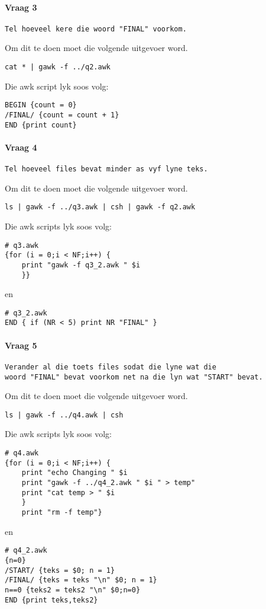 \documentclass[a4paper,11pt,titlepage]{article}
\begin{document}
\paragraph{Vraag 3}
\begin{verbatim}
Tel hoeveel kere die woord "FINAL" voorkom.
\end{verbatim}
Om dit te doen moet die volgende uitgevoer word.
\begin{verbatim}
cat * | gawk -f ../q2.awk
\end{verbatim}

Die awk script lyk soos volg:
\begin{verbatim}
BEGIN {count = 0}
/FINAL/ {count = count + 1}
END {print count}
\end{verbatim}

\paragraph{Vraag 4}
\begin{verbatim}
Tel hoeveel files bevat minder as vyf lyne teks.
\end{verbatim}
Om dit te doen moet die volgende uitgevoer word.
\begin{verbatim}
ls | gawk -f ../q3.awk | csh | gawk -f q2.awk
\end{verbatim}

Die awk scripts lyk soos volg:
\begin{verbatim}
# q3.awk
{for (i = 0;i < NF;i++) {
	print "gawk -f q3_2.awk " $i
	}}
\end{verbatim}
en
\begin{verbatim}
# q3_2.awk
END { if (NR < 5) print NR "FINAL" }
\end{verbatim}

\paragraph{Vraag 5}
\begin{verbatim}
Verander al die toets files sodat die lyne wat die
woord "FINAL" bevat voorkom net na die lyn wat "START" bevat.
\end{verbatim}
Om dit te doen moet die volgende uitgevoer word.
\begin{verbatim}
ls | gawk -f ../q4.awk | csh
\end{verbatim}

Die awk scripts lyk soos volg:
\begin{verbatim}
# q4.awk
{for (i = 0;i < NF;i++) {
	print "echo Changing " $i
	print "gawk -f ../q4_2.awk " $i " > temp"
	print "cat temp > " $i
	}
	print "rm -f temp"}

\end{verbatim}
en
\begin{verbatim}
# q4_2.awk
{n=0}
/START/ {teks = $0; n = 1}
/FINAL/ {teks = teks "\n" $0; n = 1}
n==0 {teks2 = teks2 "\n" $0;n=0}
END {print teks,teks2}
\end{verbatim}
\end{document}
